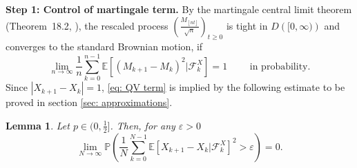 \documentclass[twoside,12pt, a4paper]{article}
\newtheorem{lemma}{Lemma}[section]
\numberwithin{equation}{section}
\theoremstyle{remark}
\newcommand{\abs}[1]{\left\vert #1 \right\vert}
\begin{document}
	\vspace{1em}
	
	\textbf{Step 1: Control of martingale term.}
	By the martingale central limit theorem (Theorem~18.2, \cite{B99}), the rescaled process $\left( \frac{M_{\left\lfloor n t \right\rfloor}}{\sqrt{n}} \right) _{t \ge 0}$ is tight in $D\left( [0,\infty ) \right) $ and converges to the standard Brownian motion, if
	\begin{equation}\label{eq: QV term}
		\lim_{n\to \infty}\frac{1}{n} \sum_{k=0}^{n-1}\mathbb{E}\left[ (M_{k+1}- M_{k})^2 |\mathcal{F}_k^X \right] =1 \qquad  \mbox{ in probability}.
	\end{equation}
	Since $\abs{X_{k+1}-X_k}=1$, \eqref{eq: QV term} is implied by the following estimate to be proved in section \ref{sec: approximations}. 
	\begin{lemma} \label{lm: control of martingale} 
		Let $p\in (0,\frac{1}{2}]$. Then, for any $\varepsilon >0$
		\begin{equation}\label{eq:  term}
			\lim_{N \to \infty }\mathbb{P}\left(\frac{1}{N} \sum_{k = 0}^{N-1} \mathbb{E}\left[ X_{k+1} - X_k | \mathcal{F}_k^X \right]^2 > \varepsilon \right) =0. 
		\end{equation}
	\end{lemma}
	\vspace{1em}
	
\end{document}
